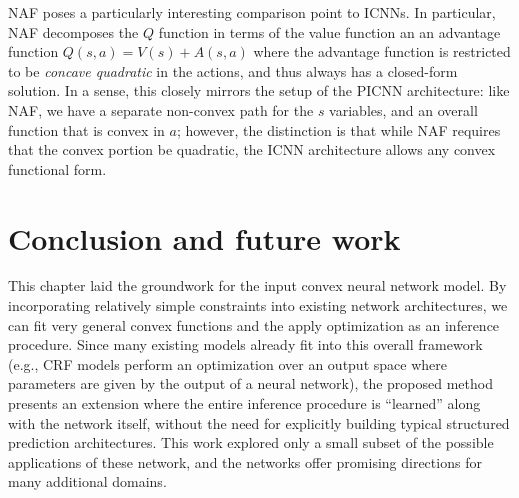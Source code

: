 NAF poses a particularly interesting comparison point to ICNNs.
In particular, NAF decomposes the $Q$ function in terms of the
value function an an advantage function
$Q(s,a) = V(s) + A(s,a)$ where the advantage function is restricted to
be \emph{concave quadratic} in the actions, and thus always has a closed-form
solution.  In a sense, this closely mirrors the setup of the PICNN architecture:
like NAF, we have a separate non-convex path for the $s$ variables, and an
overall function that is convex in $a$; however, the distinction is that while
NAF requires that the convex portion be quadratic, the ICNN
architecture allows any convex functional form.

\section{Conclusion and future work}
This chapter laid the groundwork for the input convex neural network model.  By
incorporating relatively simple constraints into existing network architectures,
we can fit very general convex functions and the apply optimization as an
inference procedure.  Since many existing models already fit into this overall
framework (e.g., CRF models perform an optimization over an output space where
parameters are given by the output of a neural network), the proposed method
presents an extension where the entire inference procedure is ``learned'' along
with the network itself, without the need for explicitly building typical
structured prediction architectures.  This work explored only a small subset of
the possible applications of these network, and the networks offer promising
directions for many additional domains.


